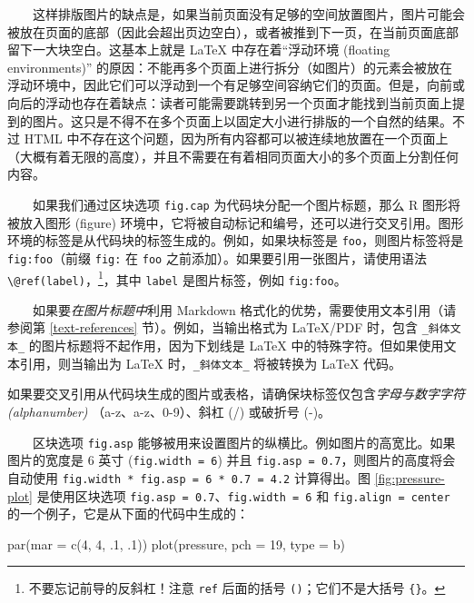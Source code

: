 \documentclass[
  12pt,
]{krantz}
\makeatletter
\newenvironment{Shaded}{\begin{snugshade}}{\end{snugshade}}
\newcommand{\AttributeTok}[1]{\textcolor[rgb]{0.77,0.63,0.00}{#1}}
\newcommand{\DecValTok}[1]{\textcolor[rgb]{0.00,0.00,0.81}{#1}}
\newcommand{\FunctionTok}[1]{\textcolor[rgb]{0.00,0.00,0.00}{#1}}
\newcommand{\NormalTok}[1]{#1}
\newcommand{\StringTok}[1]{\textcolor[rgb]{0.31,0.60,0.02}{#1}}
\newenvironment{kframe}{%
\medskip{}
\setlength{\fboxsep}{.8em}
 \def\at@end@of@kframe{}%
 \ifinner\ifhmode%
  \def\at@end@of@kframe{\end{minipage}}%
  \begin{minipage}{\columnwidth}%
 \fi\fi%
 \def\FrameCommand##1{\hskip\@totalleftmargin \hskip-\fboxsep
 \colorbox{shadecolor}{##1}\hskip-\fboxsep
     \hskip-\linewidth \hskip-\@totalleftmargin \hskip\columnwidth}%
 \MakeFramed {\advance\hsize-\width
   \@totalleftmargin\z@ \linewidth\hsize
   \@setminipage}}%
 {\par\unskip\endMakeFramed%
 \at@end@of@kframe}
\newenvironment{rmdblock}[1]
  {
  \begin{itemize}
  \renewcommand{\labelitemi}{
    \raisebox{-.7\height}[0pt][0pt]{
      {\setkeys{Gin}{width=3em,keepaspectratio}\texttt{[image: images/\#1]}}
    }
  }
  \setlength{\fboxsep}{1em}
  \begin{kframe}
  \item
  }
  {
  \end{kframe}
  \end{itemize}
  }
\newenvironment{rmdimportant}
  {\begin{rmdblock}{important}}
  {\end{rmdblock}}
\theoremstyle{definition}
\theoremstyle{definition}
\theoremstyle{definition}
\theoremstyle{definition}
\theoremstyle{remark}
\makeatother
\begin{document}
  这样排版图片的缺点是，如果当前页面没有足够的空间放置图片，图片可能会被放在页面的底部（因此会超出页边空白），或者被推到下一页，在当前页面底部留下一大块空白。这基本上就是 LaTeX 中存在着``浮动环境 (floating environments)'' 的原因：不能再多个页面上进行拆分（如图片）的元素会被放在浮动环境中，因此它们可以浮动到一个有足够空间容纳它们的页面。但是，向前或向后的浮动也存在着缺点：读者可能需要跳转到另一个页面才能找到当前页面上提到的图片。这只是不得不在多个页面上以固定大小进行排版的一个自然的结果。不过 HTML 中不存在这个问题，因为所有内容都可以被连续地放置在一个页面上（大概有着无限的高度），并且不需要在有着相同页面大小的多个页面上分割任何内容。

  如果我们通过区块选项 \texttt{fig.cap} 为代码块分配一个图片标题，那么 R 图形将被放入图形 (figure) 环境中，它将被自动标记和编号，还可以进行交叉引用。图形环境的标签是从代码块的标签生成的。例如，如果块标签是 \texttt{foo}，则图片标签将是 \texttt{fig:foo}（前缀 \texttt{fig:} 在 \texttt{foo} 之前添加）。如果要引用一张图片，请使用语法 \texttt{\textbackslash{}@ref(label)}，\footnote{不要忘记前导的反斜杠！注意 \texttt{ref} 后面的括号 \texttt{()}；它们不是大括号 \texttt{\{\}}。}，其中 \texttt{label} 是图片标签，例如 \texttt{fig:foo}。

  如果要\emph{在图片标题中}利用 Markdown 格式化的优势，需要使用文本引用（请参阅第 \ref{text-references} 节）。例如，当输出格式为 LaTeX/PDF 时，包含 \texttt{\_斜体文本\_} 的图片标题将不起作用，因为下划线是 LaTeX 中的特殊字符。但如果使用文本引用，则当输出为 LaTeX 时，\texttt{\_斜体文本\_} 将被转换为 LaTeX 代码。

\begin{rmdimportant}
如果要交叉引用从代码块生成的图片或表格，请确保块标签仅包含\emph{字母与数字字符 (alphanumber)} （a-z、a-z、0-9）、斜杠 (/) 或破折号 (-)。
\end{rmdimportant}

  区块选项 \texttt{fig.asp} 能够被用来设置图片的纵横比。例如图片的高宽比。如果图片的宽度是 6 英寸 (\texttt{fig.width\ =\ 6}) 并且 \texttt{fig.asp\ =\ 0.7}，则图片的高度将会自动使用 \texttt{fig.width\ *\ fig.asp\ =\ 6\ *\ 0.7\ =\ 4.2} 计算得出。图 \ref{fig:pressure-plot} 是使用区块选项 \texttt{fig.asp\ =\ 0.7}、\texttt{fig.width\ =\ 6} 和 \texttt{fig.align\ =\ \textquotesingle{}center\textquotesingle{}} 的一个例子，它是从下面的代码中生成的：

\begin{Shaded}
\begin{Highlighting}[]
\FunctionTok{par}\NormalTok{(}\AttributeTok{mar =} \FunctionTok{c}\NormalTok{(}\DecValTok{4}\NormalTok{, }\DecValTok{4}\NormalTok{, .}\DecValTok{1}\NormalTok{, .}\DecValTok{1}\NormalTok{))}
\FunctionTok{plot}\NormalTok{(pressure, }\AttributeTok{pch =} \DecValTok{19}\NormalTok{, }\AttributeTok{type =} \StringTok{\textquotesingle{}b\textquotesingle{}}\NormalTok{)}
\end{Highlighting}
\end{Shaded}
\end{document}

